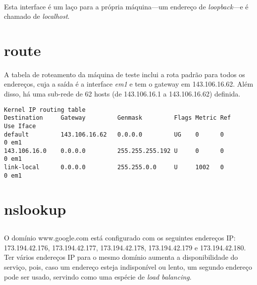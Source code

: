 \documentclass[a4paper,10pt,oneside,final,titlepage,onecolumn]{article}
\begin{document}
\paragraph{}Esta interface é um laço para a própria máquina---um endereço de \emph{loopback}---e é chamado de \emph{localhost}.



\section{route}

\paragraph{}A tabela de roteamento da máquina de teste inclui a rota padrão para todos os endereços, cuja a saída é a interface \emph{em1} e tem o gateway em \mbox{143.106.16.62}. Além disso, há uma sub-rede de 62 hosts (de \mbox{143.106.16.1} a \mbox{143.106.16.62}) definida.
\begin{lstlisting}
Kernel IP routing table
Destination     Gateway         Genmask         Flags Metric Ref    Use Iface
default         143.106.16.62   0.0.0.0         UG    0      0        0 em1
143.106.16.0    0.0.0.0         255.255.255.192 U     0      0        0 em1
link-local      0.0.0.0         255.255.0.0     U     1002   0        0 em1
\end{lstlisting}



\section{nslookup}

\subsection{}
\paragraph{}O domínio \mbox{www.google.com} está configurado com os seguintes endereços IP: \mbox{173.194.42.176}, \mbox{173.194.42.177}, \mbox{173.194.42.178}, \mbox{173.194.42.179} e \mbox{173.194.42.180}. Ter vários endereços IP para o mesmo domínio aumenta a disponibilidade do serviço, pois, caso um endereço esteja indisponível ou lento, um segundo endereço pode ser usado, servindo como uma espécie de \emph{load balancing}.
\end{document}
